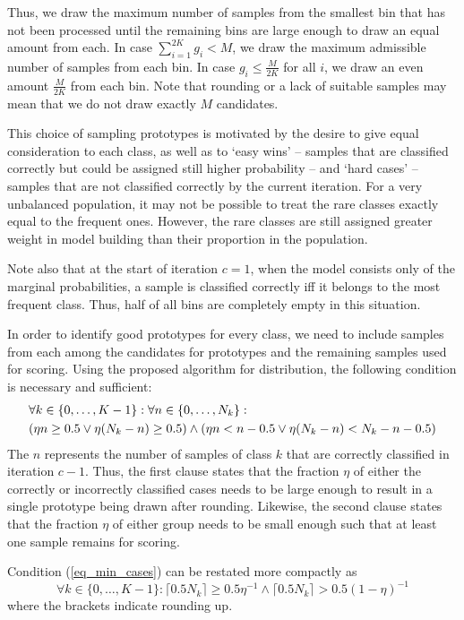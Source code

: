 %
Thus, we draw the maximum number of samples from the smallest bin that has not been processed until the remaining bins are large enough to draw an equal amount from each.
In case $\sum_{i=1}^{2K}g_i<M$,  we draw the maximum admissible number of samples from each bin.
In case $g_i\leq\frac{M}{2K}$ for all $i$, we draw an even amount $\frac{M}{2K}$ from each bin.
Note that rounding or a lack of suitable samples may mean that we do not draw exactly $M$ candidates.\par
%
\begin{remark}
This choice of sampling prototypes is motivated by the desire to give equal consideration to each class, as well as to `easy wins' -- samples that are classified correctly but could be assigned still higher probability -- and `hard cases' -- samples that are not classified correctly by the current iteration.
For a very unbalanced population, it may not be possible to treat the rare classes exactly equal to the frequent ones.
However, the rare classes are still assigned greater weight in model building than their proportion in the population.\par
%
Note also that at the start of iteration $c=1$, when the model consists only of the marginal probabilities, a sample is classified correctly iff it belongs to the most frequent class.
Thus, half of all bins are completely empty in this situation.
\end{remark}
%
In order to identify good prototypes for every class, we need to include samples from each among the candidates for prototypes and the remaining samples used for scoring. Using the proposed algorithm for distribution, the following condition is necessary and sufficient:
%
\begin{align}
&\forall k\in\{0,\dots,K-1\}:\forall n\in\{0,\dots,N_k\}:\label{eq_min_cases}\\
&(\eta n\geq0.5\vee\eta(N_k-n)\geq0.5)\wedge(\eta n<n-0.5\vee\eta(N_k-n)<N_k-n-0.5)\notag
\end{align}
%
The $n$ represents the number of samples of class $k$ that are correctly classified in iteration $c-1$.
Thus, the first clause states that the fraction $\eta$ of either the correctly or incorrectly classified cases needs to be large enough to result in a single prototype being drawn after rounding.
Likewise, the second clause states that the fraction $\eta$ of either group needs to be small enough such that at least one sample remains for scoring.\par
%
\begin{lemma}
Condition (\ref{eq_min_cases}) can be restated more compactly as
%
\begin{equation}
\forall k\in\{0,\dots,K-1\}:\lceil0.5N_k\rceil\geq0.5\eta^{-1}\wedge\lceil0.5N_k\rceil>0.5(1-\eta)^{-1}\label{eq_min_cases_2}
\end{equation}
%
where the brackets indicate rounding up.
\end{lemma}
%
